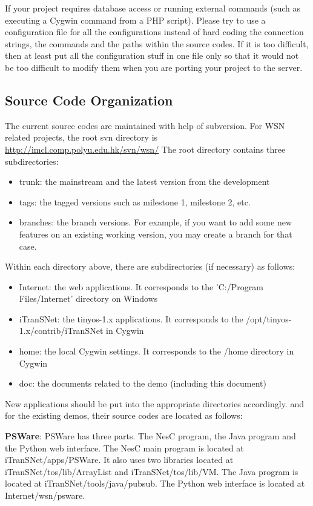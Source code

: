 If your project requires database access or running external commands (such as executing a Cygwin command from a PHP script). Please try to use a configuration file for all the configurations instead of hard coding the connection strings, the commands and the paths within the source codes. If it is too difficult, then at least put all the configuration stuff in one file only so that it would not be too difficult to modify them when you are porting your project to the server.

\subsection{Source Code Organization}
\label{sec:source}
The current source codes are maintained with help of subversion. For WSN related projects, the root svn directory is \url{http://imcl.comp.polyu.edu.hk/svn/wsn/} The root directory contains three subdirectories:
\begin{itemize}
\item trunk: the mainstream and the latest version from the development
\item tags: the tagged versions such as milestone 1, milestone 2, etc.
\item branches: the branch versions. For example, if you want to add some new features on an existing working version, you may create a branch for that case.
\end{itemize}

Within each directory above, there are subdirectories (if necessary) as follows:
\begin{itemize}
\item Internet: the web applications. It corresponds to the 'C:/Program Files/Internet' directory on Windows
\item iTranSNet: the tinyos-1.x applications. It corresponds to the /opt/tinyos-1.x/contrib/iTranSNet in Cygwin
\item home: the local Cygwin settings. It corresponds to the /home directory in Cygwin
\item doc: the documents related to the demo (including this document)
\end{itemize}

New applications should be put into the appropriate directories accordingly. and for the existing demos, their source codes are located as follows:

\textbf{PSWare}: PSWare has three parts. The NesC program, the Java program and the Python web interface. The NesC main program is located at iTranSNet/apps/PSWare. It also uses two libraries located at iTranSNet/tos/lib/ArrayList and iTranSNet/tos/lib/VM. The Java program is located at iTranSNet/tools/java/pubsub. The Python web interface is located at Internet/wsn/psware.

